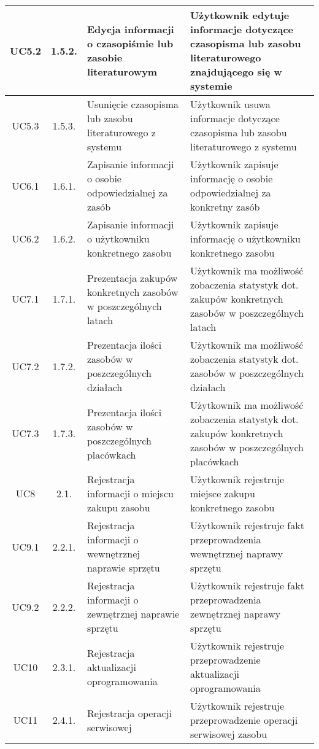 \begin{longtable}{| c | c | p{} | p{} |}
	\hline UC5.2 & 1.5.2. & Edycja informacji o czasopiśmie lub zasobie literaturowym & Użytkownik edytuje informacje dotyczące czasopisma lub zasobu literaturowego znajdującego się w systemie \\ 
	\hline UC5.3 & 1.5.3.  & Usunięcie czasopisma lub zasobu literaturowego z systemu & Użytkownik usuwa informacje dotyczące czasopisma lub zasobu literaturowego z systemu \\ 
	\hline UC6.1 & 1.6.1. & Zapisanie informacji o osobie odpowiedzialnej za zasób & Użytkownik zapisuje informację o osobie odpowiedzialnej za konkretny zasób \\ 
	\hline UC6.2 & 1.6.2. & Zapisanie informacji o użytkowniku konkretnego zasobu & Użytkownik zapisuje informację o użytkowniku konkretnego zasobu \\ 
	\hline UC7.1 & 1.7.1. & Prezentacja zakupów konkretnych zasobów w poszczególnych latach & Użytkownik ma możliwość zobaczenia statystyk dot. zakupów konkretnych zasobów w poszczególnych latach \\ 
	\hline UC7.2 & 1.7.2. & Prezentacja ilości zasobów w poszczególnych działach & Użytkownik ma możliwość zobaczenia statystyk dot. zasobów w poszczególnych działach \\ 
	\hline UC7.3 & 1.7.3. & Prezentacja ilości zasobów w poszczególnych placówkach & Użytkownik ma możliwość zobaczenia statystyk dot. zakupów konkretnych zasobów w poszczególnych placówkach \\ 
	\hline UC8 & 2.1. & Rejestracja informacji o miejscu zakupu zasobu & Użytkownik rejestruje miejsce zakupu konkretnego zasobu \\ 
	\hline UC9.1 & 2.2.1. & Rejestracja informacji o wewnętrznej naprawie sprzętu & Użytkownik rejestruje fakt przeprowadzenia wewnętrznej naprawy sprzętu \\ 
	\hline UC9.2 & 2.2.2. & Rejestracja informacji o zewnętrznej naprawie sprzętu & Użytkownik rejestruje fakt przeprowadzenia zewnętrznej naprawy sprzętu \\ 
	\hline UC10 & 2.3.1. & Rejestracja aktualizacji oprogramowania & Użytkownik rejestruje przeprowadzenie aktualizacji oprogramowania \\ 
	\hline UC11 & 2.4.1. & Rejestracja operacji serwisowej & Użytkownik rejestruje przeprowadzenie operacji serwisowej zasobu \\ 
	\hline 
\end{longtable} 


